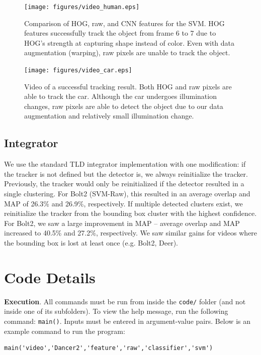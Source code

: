 \documentclass[10pt,twocolumn,letterpaper]{article}
\begin{document}
\begin{figure}
\vspace{-10mm}
	\texttt{[image: figures/video\_human.eps]}
	\caption{Comparison of HOG, raw, and CNN features for the SVM. HOG features successfully track the object from frame 6 to 7 due to HOG's strength at capturing shape instead of color. Even with data augmentation (warping), raw pixels are unable to track the object.}
	\label{fig:human}
	\vspace{5mm}
	\texttt{[image: figures/video\_car.eps]}
	\caption{Video  of a successful tracking result. Both HOG and raw pixels are able to track the car. Although the car undergoes illumination changes, raw pixels are able to detect the object due to our data augmentation and relatively small illumination change.}
	\label{fig:car}
\end{figure}


\subsection{Integrator}

We use the standard TLD integrator implementation with one modification: if the tracker is not defined but the detector is, we always reinitialize the tracker. Previously, the tracker would only be reinitialized if the detector resulted in a single clustering. For Bolt2 (SVM-Raw), this resulted in an average overlap and MAP of 26.3\% and 26.9\%, respectively. If multiple detected clusters exist, we reinitialize the tracker from the bounding box cluster with the highest confidence. For Bolt2, we saw a large improvement in MAP -- average overlap and MAP increased to 40.5\% and 27.2\%, respectively. We saw similar gains for videos where the bounding box is lost at least once (e.g. Bolt2, Deer).

\section{Code Details}

\textbf{Execution}. All commands must be run from inside the \texttt{code/} folder (and not inside one of its subfolders). To view the help message, run the following command: \texttt{main()}. Inputs must be entered in argument-value pairs. Below is an example command to run the program:

{\scriptsize
\begin{verbatim}
main('video','Dancer2','feature','raw','classifier','svm')
\end{verbatim}
}
\end{document}
